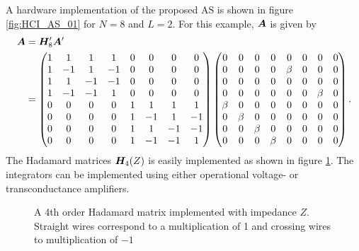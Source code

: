 A hardware implementation of the proposed AS is shown in figure \ref{fig:HCI_AS_01} for $N=8$ and $L=2$. For this example, $\bm{A}$ is given by
\begin{align}
    \bm{A} & = \bm{H}'_8 \bm{A}' \\  & =
    \begin{pmatrix}
        1 & 1 & 1 & 1 & 0 & 0 & 0 & 0 \\
        1 & -1 & 1 & -1 & 0 & 0 & 0 & 0 \\
        1 & 1 & -1 & -1 & 0 & 0 & 0 & 0 \\
        1 & -1 & -1 & 1 & 0 & 0 & 0 & 0 \\
        0 & 0 & 0 & 0 & 1 & 1 & 1 & 1 \\
        0 & 0 & 0 & 0 & 1 & -1 & 1 & -1 \\
        0 & 0 & 0 & 0 & 1 & 1 & -1 & -1 \\
        0 & 0 & 0 & 0 & 1 & -1 & -1 & 1
    \end{pmatrix}
    \begin{pmatrix}
        0 & 0 & 0 & 0 & 0 & 0 & 0 & 0 \\
        0 & 0 & 0 & 0 & \beta & 0 & 0 & 0 \\
        0 & 0 & 0 & 0 & 0 & 0 & 0 & 0 \\
        0 & 0 & 0 & 0 & 0 & 0 & \beta & 0 \\
        \beta & 0 & 0 & 0 & 0 & 0 & 0 & 0 \\
        0 & \beta & 0 & 0 & 0 & 0 & 0 & 0 \\
        0 & 0 & \beta & 0 & 0 & 0 & 0 & 0 \\
        0 & 0 & 0 & \beta & 0 & 0 & 0 & 0
    \end{pmatrix}.
\end{align}
The Hadamard matrices $\bm{H_}{4}(Z)$ is easily implemented as shown in figure \ref{fig:H4Z}. The integrators can be implemented using either operational voltage- or transconductance amplifiers.

\begin{figure}[htbp]
    \centering
    
    \caption{A 4th order Hadamard matrix implemented with impedance $Z$. Straight wires correspond to a multiplication of 1 and crossing wires to multiplication of $-1$}
    \label{fig:H4Z}
\end{figure}


\begin{sidewaysfigure}[htbp]
    \centering
    
    \caption{Proposed hardware implementation of the Hadamard ADC AS for $N=8, L=2$}
    \label{fig:HCI_AS_01}
\end{sidewaysfigure}


\begin{figure}[htbp]
    \centering
    
\end{figure}

\begin{figure}[htbp]
    \centering
    
\end{figure}

\begin{figure}[htbp]
    \centering
    
\end{figure}


